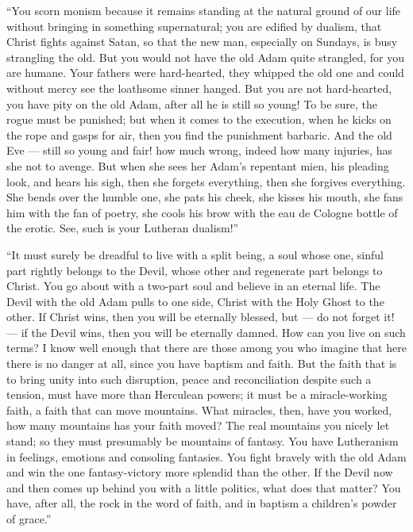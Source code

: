 \documentclass[12pt,a4paper,openany]{book}
\newcommand{\opage}[1]{\marginnote{\footnotesize\textit{[#1]}}}
\begin{document}
``You scorn monism because it remains
standing at the natural ground of our life without bringing in
something supernatural; you are edified by dualism, that Christ
fights against Satan, so that the new man, especially on
\setcounter{footnote}{0}%
\opage{100}Sundays, is busy strangling the old. But
you would not have the old Adam quite strangled, for you are
humane. Your fathers were hard-hearted, they whipped
the old one and could without mercy see the loathsome
sinner hanged. But you are not hard-hearted, you have
pity on the old Adam, after all he is still so
young! To be sure, the rogue must be punished; but
when it comes to the execution, when he kicks on
the rope and gasps for air, then you find the punishment barbaric.
And the old Eve --- still so young and fair!
how much wrong, indeed how many injuries, has she not
to avenge. But when she sees her Adam's repentant mien,
his pleading look, and hears his sigh, then she forgets
everything, then she forgives everything. She bends over the
humble one, she pats his cheek, she kisses his
mouth, she fans him with the fan of poetry, she cools
his brow with the eau de Cologne bottle of the erotic. See,
such is your Lutheran dualism!''

``It must surely be dreadful to live with
a split being, a soul whose one, sinful part
rightly belongs to the Devil, whose other and regenerate
part belongs to Christ. You go about with a two-part
soul and believe in an eternal life. The Devil with the
old Adam pulls to one side, Christ with
the Holy Ghost to the other. If Christ wins,
then you will be eternally blessed, but --- do not forget it! ---
if the Devil wins, then you will be eternally damned. How
can you live on such terms? I know well enough
that there are those among you who imagine that here
there is no danger at all, since you have baptism and faith.
But the faith that is to bring unity into such
\setcounter{footnote}{0}%
\opage{101}disruption, peace and reconciliation despite such a tension,
must have more than Herculean powers; it must be
a miracle-working faith, a faith that can move mountains.
What miracles, then, have you worked, how many mountains has
your faith moved? The real mountains you nicely let
stand; so they must presumably be mountains of fantasy. You have
Lutheranism in feelings, emotions and consoling fantasies.
You fight bravely with the old Adam and win the
one fantasy-victory more splendid than the other.
If the Devil now and then comes up behind you with
a little politics, what does that matter? You have, after all, the rock
in the word of faith, and in baptism a children's powder of grace.''
\end{document}
